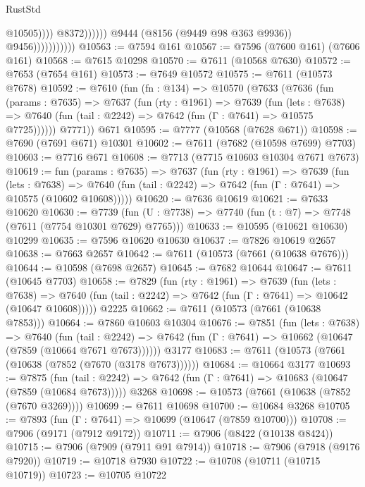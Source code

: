 \begin{lexlean}{RustStd}
\begin{coremodule}
{\begin{coremodule}
{{{{{{{{{{{{{{{{{{{{{{{{{{{{{{{{{{                                              @10505))))
                                      @8372))))))
                          @9444
                          (@8156 (@9449 @98 @363 @9936))
                          @9456)))))))))))
@10563 := @7594 @161
@10567 := @7596 (@7600 @161) (@7606 @161)
@10568 := @7615 @10298
@10570 := @7611 (@10568 @7630)
@10572 := @7653 (@7654 @161)
@10573 := @7649 @10572
@10575 := @7611 (@10573 @7678)
@10592 := @7610
    (fun (fn : @134) =>
    @10570
      (@7633
        (@7636
          (fun (params : @7635) =>
          @7637
            (fun (rty : @1961) =>
            @7639
              (fun (lets : @7638) =>
              @7640 (fun (tail : @2242) => @7642 (fun (Γ : @7641) => @10575 @7725))))))
        @7771))
    @671
@10595 := @7777 (@10568 (@7628 @671))
@10598 := @7690 (@7691 @671) @10301
@10602 := @7611 (@7682 (@10598 @7699) @7703)
@10603 := @7716 @671
@10608 := @7713 (@7715 @10603 @10304 @7671 @7673)
@10619 := fun (params : @7635) =>
  @7637
    (fun (rty : @1961) =>
    @7639
      (fun (lets : @7638) =>
      @7640 (fun (tail : @2242) => @7642 (fun (Γ : @7641) => @10575 (@10602 @10608)))))
@10620 := @7636 @10619
@10621 := @7633 @10620
@10630 := @7739
    (fun (U : @7738) => @7740 (fun (t : @7) => @7748 (@7611 (@7754 @10301 @7629) @7765)))
@10633 := @10595 (@10621 @10630) @10299
@10635 := @7596 @10620 @10630
@10637 := @7826 @10619 @2657
@10638 := @7663 @2657
@10642 := @7611 (@10573 (@7661 (@10638 @7676)))
@10644 := @10598 (@7698 @2657)
@10645 := @7682 @10644
@10647 := @7611 (@10645 @7703)
@10658 := @7829
    (fun (rty : @1961) =>
    @7639
      (fun (lets : @7638) =>
      @7640 (fun (tail : @2242) => @7642 (fun (Γ : @7641) => @10642 (@10647 @10608)))))
    @2225
@10662 := @7611 (@10573 (@7661 (@10638 @7853)))
@10664 := @7860 @10603 @10304
@10676 := @7851
    (fun (lets : @7638) =>
    @7640
      (fun (tail : @2242) =>
      @7642 (fun (Γ : @7641) => @10662 (@10647 (@7859 (@10664 @7671 @7673))))))
    @3177
@10683 := @7611 (@10573 (@7661 (@10638 (@7852 (@7670 (@3178 @7673))))))
@10684 := @10664 @3177
@10693 := @7875
    (fun (tail : @2242) => @7642 (fun (Γ : @7641) => @10683 (@10647 (@7859 (@10684 @7673)))))
    @3268
@10698 := @10573 (@7661 (@10638 (@7852 (@7670 @3269))))
@10699 := @7611 @10698
@10700 := @10684 @3268
@10705 := @7893 (fun (Γ : @7641) => @10699 (@10647 (@7859 @10700)))
@10708 := @7906 (@9171 (@7912 @9172))
@10711 := @7906 (@8422 (@10138 @8424))
@10715 := @7906 (@7909 (@7911 @91 @7914))
@10718 := @7906 (@7918 (@9176 @7920))
@10719 := @10718 @7930
@10722 := @10708 (@10711 (@10715 @10719))
@10723 := @10705 @10722
}}}}}}}}}}}}}}}}}}}}}}}}}}}}}}}}}}
\end{coremodule}}
\end{coremodule}
\end{lexlean}
